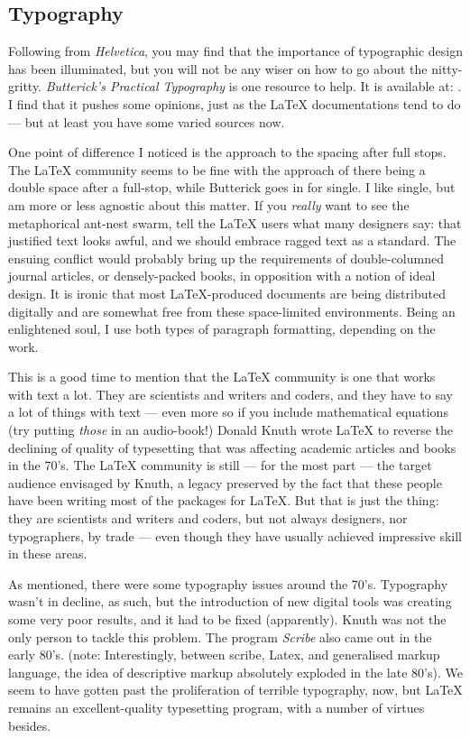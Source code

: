 \documentclass[12pt, oneside]{memoir}
\begin{document}
\subsection{Typography}
Following from \emph{Helvetica}, you may find that the importance of typographic design has been illuminated, but you will not be any wiser on how to go about the nitty-gritty. \emph{Butterick's Practical Typography} is one resource to help. It is available at: . I find that it pushes some opinions, just as the \LaTeX{} documentations tend to do — but at least you have some varied sources now. 

One point of difference I noticed is the approach to the spacing after full stops. The \LaTeX{} community seems to be fine with the approach of there being a double space after a full-stop, while Butterick goes in for single. I like single, but am more or less agnostic about this matter. If you \emph{really} want to see the metaphorical ant-nest swarm, tell the \LaTeX{} users what many designers say: that justified text looks awful, and we should embrace ragged text as a standard. The ensuing conflict would probably bring up the requirements of double-columned journal articles, or densely-packed books, in opposition with a notion of ideal design. It is ironic that most \LaTeX{}-produced documents are being distributed digitally and are somewhat free from these space-limited environments. Being an enlightened soul, I use both types of paragraph formatting, depending on the work.

This is a good time to mention that the \LaTeX{} community is one that works with text a lot. They are scientists and writers and coders, and they have to say a lot of things with text — even more so if you include mathematical equations (try putting \emph{those} in an audio-book!) Donald Knuth wrote \LaTeX{} to reverse the declining of quality of typesetting that was affecting academic articles and books in the 70's. The \LaTeX{} community is still — for the most part — the target audience envisaged by Knuth, a legacy preserved by the fact that these people have been writing most of the packages for \LaTeX{}. But that is just the thing: they are scientists and writers and coders, but not always designers, nor typographers, by trade — even though they have usually achieved impressive skill in these areas.

As mentioned, there were some typography issues around the 70's. Typography wasn't in decline, as such, but the introduction of new digital tools was creating some very poor results, and it had to be fixed (apparently). Knuth was not the only person to tackle this problem. The program \emph{Scribe} also came out in the early 80's. (note: Interestingly, between scribe, Latex, and generalised markup language, the idea of descriptive markup absolutely exploded in the late 80's). We seem to have gotten past the proliferation of terrible typography, now, but \LaTeX{} remains an excellent-quality typesetting program, with a number of virtues besides.
\end{document}

